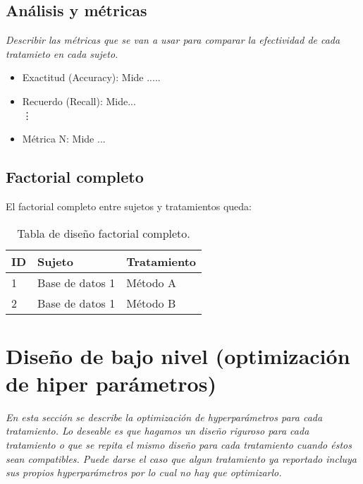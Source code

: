 \documentclass[12pt,twoside,letterpaper]{article}
\begin{document}
\subsection{Análisis y métricas}

\emph{Describir las métricas que se van a usar para comparar la efectividad de cada tratamieto en cada sujeto.}

\begin{itemize}
    \item Exactitud (Accuracy): Mide .....
    \item Recuerdo (Recall): Mide... \\
    \vdots
    \item Métrica N: Mide ...
\end{itemize}

\subsection{Factorial completo}

El factorial completo entre sujetos y tratamientos queda:

\begin{table}[h]
\centering
\begin{tabular}{|l|ll|}
\hline
\textbf{ID}  & \multicolumn{1}{l|}{\textbf{Sujeto}} & \textbf{Tratamiento} \\ \hline
1  & \multicolumn{1}{l|}{Base de datos 1} & Método A          \\ \hline
2  & \multicolumn{1}{l|}{Base de datos 1}     & Método B          \\ \hline
\end{tabular}
\caption{Tabla de diseño factorial completo.}
\end{table}

\section{Diseño de bajo nivel (optimización de hiper parámetros)}

\emph{En esta sección se describe la optimización de hyperparámetros para cada tratamiento. Lo deseable es que hagamos un diseño riguroso para cada tratamiento o que se repita el mismo diseño para cada tratamiento cuando éstos sean compatibles. Puede darse el caso que algun tratamiento ya reportado incluya sus propios hyperparámetros por lo cual no hay que optimizarlo. }
\end{document}
